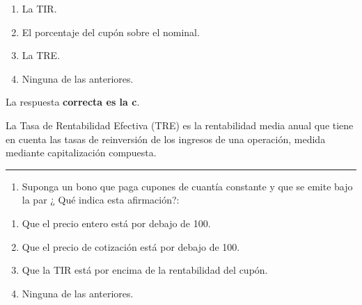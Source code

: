 \documentclass[
  letterpaper,
  DIV=11,
  numbers=noendperiod]{scrreprt}
\providecommand{\tightlist}{%
  \setlength{\itemsep}{0pt}\setlength{\parskip}{0pt}}\usepackage{longtable,booktabs,array}
\begin{document}
\begin{enumerate}
\def\labelenumi{\alph{enumi}.}
\item
  La TIR.
\item
  El porcentaje del cupón sobre el nominal.
\item
  La TRE.
\item
  Ninguna de las anteriores.
\end{enumerate}

\begin{tcolorbox}[enhanced jigsaw, left=2mm, opacityback=0, colback=white, breakable, arc=.35mm, bottomrule=.15mm, rightrule=.15mm, toprule=.15mm, leftrule=.75mm, colframe=quarto-callout-tip-color-frame]
\begin{minipage}[t]{5.5mm}
\textcolor{quarto-callout-tip-color}{\faLightbulb}
\end{minipage}%
\begin{minipage}[t]{\textwidth - 5.5mm}

La respuesta \textbf{correcta es la c}.

La Tasa de Rentabilidad Efectiva (TRE) es la rentabilidad media anual
que tiene en cuenta las tasas de reinversión de los ingresos de una
operación, medida mediante capitalización compuesta.

\end{minipage}%
\end{tcolorbox}

\begin{center}\rule{0.5\linewidth}{0.5pt}\end{center}

\begin{enumerate}
\def\labelenumi{\arabic{enumi}.}
\setcounter{enumi}{14}
\tightlist
\item
  Suponga un bono que paga cupones de cuantía constante y que se emite
  bajo la par ¿ Qué indica esta afirmación?:
\end{enumerate}

\begin{enumerate}
\def\labelenumi{\alph{enumi}.}
\item
  Que el precio entero está por debajo de 100.
\item
  Que el precio de cotización está por debajo de 100.
\item
  Que la TIR está por encima de la rentabilidad del cupón.
\item
  Ninguna de las anteriores.
\end{enumerate}
\end{document}
